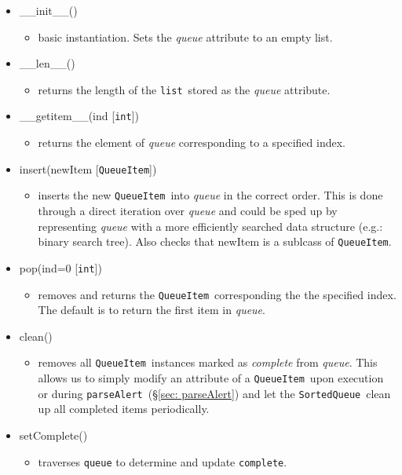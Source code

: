 \documentclass{article}
\newcommand{\parseAlert}{\texttt{parseAlert}}
\newcommand{\SortedQueue}{\texttt{SortedQueue}}
\newcommand{\QueueItem}{\texttt{QueueItem}}
\newcommand{\pythonint}{\texttt{int}}
\newcommand{\pythonlist}{\texttt{list}}
\begin{document}
\begin{itemize}
    \item{\_\_init\_\_()
        \begin{itemize}
            \item{basic instantiation. Sets the \textit{queue} attribute to an empty list.}
        \end{itemize}
         }
    \item{\_\_len\_\_()
        \begin{itemize}
            \item{returns the length of the \pythonlist~stored as the \textit{queue} attribute.}
        \end{itemize}
         }
    \item{\_\_getitem\_\_(ind [\pythonint])
        \begin{itemize}
            \item{returns the element of \textit{queue} corresponding to a specified index.}
        \end{itemize}
         }
    \item{insert(newItem [\QueueItem])
        \begin{itemize}
            \item{inserts the new \QueueItem~into \textit{queue} in the correct order. This is done through a direct iteration over \textit{queue} and could be sped up by representing \textit{queue} with a more efficiently searched data structure (e.g.: binary search tree). Also checks that newItem is a sublcass of \QueueItem.}
        \end{itemize}
         }
    \item{pop(ind=0 [\pythonint])
        \begin{itemize}
            \item{removes and returns the \QueueItem~corresponding the the specified index. The default is to return the first item in \textit{queue}.}
        \end{itemize}
         }
    \item{clean()
        \begin{itemize}
            \item{removes all \QueueItem~instances marked as \textit{complete} from \textit{queue}. This allows us to simply modify an attribute of a \QueueItem~upon execution or during \parseAlert~(\S\ref{sec: parseAlert}) and let the \SortedQueue~clean up all completed items periodically.}
        \end{itemize}
         }
    \item{setComplete()
        \begin{itemize}
            \item{traverses \texttt{queue} to determine and update \texttt{complete}.}
        \end{itemize}
         }
\end{itemize}
\end{document}
